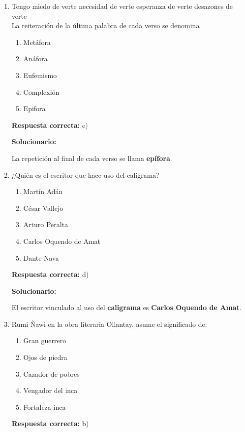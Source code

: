 \begin{enumerate}[resume]

	
	\item Tengo miedo de verte necesidad de verte esperanza de verte desazones de verte\\
	La reiteración de la última palabra de cada verso se denomina
	\begin{enumerate}[label=\alph*)]
		\item Metáfora
		\item Anáfora
		\item Eufemismo
		\item Complexión
		\item Epifora
	\end{enumerate}
	\textbf{Respuesta correcta:} e)
	
	\vspace{2mm}
	\textbf{Solucionario:}
	
	La repetición al final de cada verso se llama \textbf{epífora}.
	
	\vspace{6mm}
	
	\item ¿Quién es el escritor que hace uso del caligrama?
	\begin{enumerate}[label=\alph*)]
		\item Martín Adán
		\item César Vallejo
		\item Arturo Peralta
		\item Carlos Oquendo de Amat
		\item Dante Nava
	\end{enumerate}
	\textbf{Respuesta correcta:} d)
	
	\vspace{2mm}
	\textbf{Solucionario:}
	
	El escritor vinculado al uso del \textbf{caligrama} es \textbf{Carlos Oquendo de Amat}.
	
	\vspace{6mm}
	
	\item Rumi Ñawi en la obra literaria Ollantay, asume el significado de:
	\begin{enumerate}[label=\alph*)]
		\item Gran guerrero
		\item Ojos de piedra
		\item Cazador de pobres
		\item Vengador del inca
		\item Fortaleza inca
	\end{enumerate}
	\textbf{Respuesta correcta:} b)
	

\end{enumerate}

